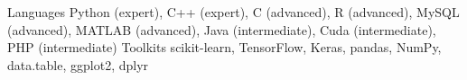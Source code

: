 \begin{cvskills}
  \cvskill
    {Languages} %
    {Python (expert), C++ (expert), C (advanced), R (advanced), MySQL (advanced), MATLAB (advanced), Java (intermediate), Cuda (intermediate), PHP (intermediate)} %
  \cvskill
    {Toolkits} %
    {scikit-learn, TensorFlow, Keras, pandas, NumPy, data.table, ggplot2, dplyr} %
\end{cvskills}
